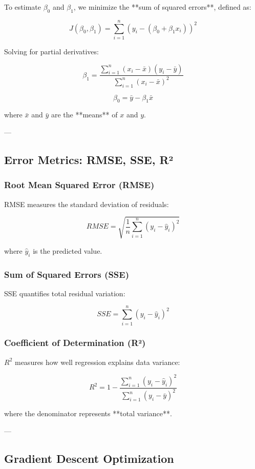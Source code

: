 To estimate \( \beta_0 \) and \( \beta_1 \), we minimize the **sum of squared errors**, defined as:

\[
J(\beta_0, \beta_1) = \sum_{i=1}^{n} (y_i - (\beta_0 + \beta_1 x_i))^2
\]

Solving for partial derivatives:

\[
\beta_1 = \frac{\sum_{i=1}^{n} (x_i - \bar{x})(y_i - \bar{y})}{\sum_{i=1}^{n} (x_i - \bar{x})^2}
\]

\[
\beta_0 = \bar{y} - \beta_1 \bar{x}
\]

where \( \bar{x} \) and \( \bar{y} \) are the **means** of \( x \) and \( y \).

---

\subsection{Error Metrics: RMSE, SSE, R²}

\subsubsection{Root Mean Squared Error (RMSE)}

RMSE measures the standard deviation of residuals:

\[
RMSE = \sqrt{\frac{1}{n} \sum_{i=1}^{n} (y_i - \hat{y}_i)^2}
\]

where \( \hat{y}_i \) is the predicted value.

\subsubsection{Sum of Squared Errors (SSE)}

SSE quantifies total residual variation:

\[
SSE = \sum_{i=1}^{n} (y_i - \hat{y}_i)^2
\]

\subsubsection{Coefficient of Determination (R²)}

\( R^2 \) measures how well regression explains data variance:

\[
R^2 = 1 - \frac{\sum_{i=1}^{n} (y_i - \hat{y}_i)^2}{\sum_{i=1}^{n} (y_i - \bar{y})^2}
\]

where the denominator represents **total variance**.

---

\subsection{Gradient Descent Optimization}

